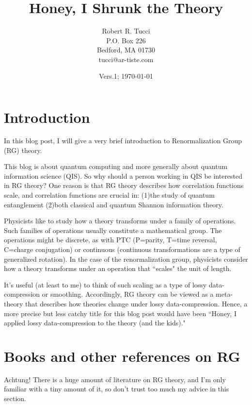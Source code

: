 \documentclass[12pt]{article}
\begin{document}
\title{Honey, I Shrunk the Theory}


\author{Robert R. Tucci\\
        P.O. Box 226\\
        Bedford,  MA   01730\\
        tucci@ar-tiste.com}


\date{Vers.1; \today}

\maketitle


\section{Introduction}
In this blog post, I will
give a very brief
introduction to Renormalization Group (RG)
theory.

This blog is about quantum computing
and more generally about
quantum information science (QIS).
So why should a person working in QIS
be interested in RG theory?
One reason is that
RG theory describes how
correlation functions
scale, and
correlation functions
are crucial in: (1)the study of quantum entanglement
(2)both classical and quantum Shannon information
theory.

Physicists
like to study how a
theory transforms under a family of operations.
Such families of operations
usually constitute a mathematical group.
The operations might be discrete, as with
PTC (P=parity, T=time reversal, C=charge conjugation)
or continuous (continuous transformations
are a type of generalized rotation). In
the case of the renormalization
group, physicists consider
how a theory transforms under
an operation that ``scales"
 the unit of length.

It's useful (at least to me) to think
of such scaling as a type of
lossy data-compression or
smoothing.
Accordingly,
RG theory can be viewed
as a meta-theory
that describes how theories change under
lossy data-compression. Hence, a
more precise
but less catchy title for this blog post
would have been ``Honey,
I applied lossy data-compression to
 the theory (and the kids)."



\section{Books and other references on RG}
Achtung! There is a huge amount of
literature on RG theory,
and I'm only familiar with
a tiny amount of it,
so don't trust too much my advice
in this section.
\end{document}
